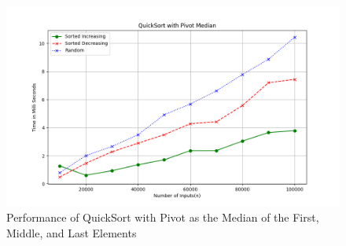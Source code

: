 \documentclass[a4paper,12pt]{report}
\begin{document}
\begin{figure}[H]
    \centering
    \includegraphics[width=1.1\textwidth]{./QuickSortPivotMedian.png}
    \caption{Performance of QuickSort with Pivot as the Median of the First, Middle, and Last Elements}
    \label{fig:quicksort_median_pivot}
\end{figure}
\end{document}
